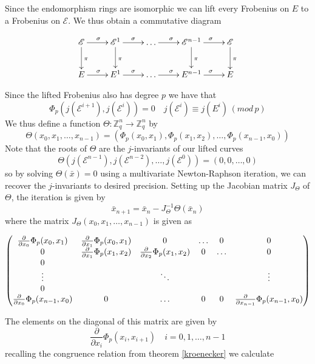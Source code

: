 Since the endomorphism rings are isomorphic we can lift every Frobenius on $E$ to a
Frobenius on $\mathscr{E}$. We thus obtain a commutative diagram

$$
\xymatrix {
  \mathscr{E} \ar[d]^\pi \ar[r]^\sigma & \mathscr{E}^1 \ar[d]^\pi \ar[r]^\sigma & \ldots \ar[r]^\sigma & \mathscr{E}^{n-1} \ar[d]^\pi \ar[r]^\sigma & \mathscr{E} \ar[d]^\pi \\
  E \ar[r]^\sigma & E^1 \ar[r]^\sigma &\ldots \ar[r]^\sigma & E^{n-1} \ar[r]^\sigma & E \\
}
$$

Since the lifted Frobenius also has degree $p$ we have that
$$\Phi_p(j(\mathscr{E}^{i+1}), j(\mathscr{E}^{i})) = 0 \quad j(\mathscr{E}^i) \equiv j(E^i) \, (mod\, p) $$
We thus define a function $\Theta: \mathbb{Z}_q^n \rightarrow \mathbb{Z}_q^n$ by
$$\Theta(x_0, x_1, \ldots, x_{n-1}) = (\Phi_p(x_0, x_1), \Phi_p(x_1, x_2), \ldots, \Phi_p(x_{n-1}, x_0))$$
Note that the roots of $\Theta$ are the $j$-invariants of our lifted curves
$$\Theta(j(\mathscr{E}^{n-1}), j(\mathscr{E}^{n-2}), \ldots, j(\mathscr{E}^0)) = (0, 0, \ldots, 0) $$
so by solving $\Theta(\bar{x}) = 0$ using a multivariate Newton-Raphson iteration, we can
recover the $j$-invariants to desired precision. Setting up the Jacobian matrix $J_\Theta$
of $\Theta$, the iteration is given by
$$ \bar{x}_{n+1} = \bar{x}_n - J_\Theta^{-1} \Theta(\bar{x}_n) $$
where the matrix $J_\Theta(x_0, x_1, \ldots, x_{n-1})$ is given as 

$$
\begin{pmatrix}
  {\partial \over \partial x_0} \Phi_p(x_0, x_1) & {\partial \over \partial x_1} \Phi_p(x_0, x_1) & 0 & \ldots & 0 & 0 \\
  0 & {\partial \over \partial x_1} \Phi_p(x_1, x_2) & {\partial \over \partial x_2} \Phi_p(x_1, x_2) & 0 & \ldots & 0 \\
  0 \\
  \vdots & & \ddots & & & \vdots \\
  0 \\
  {\partial \over \partial x_0} \Phi_p(x_{n-1}, x_0) & 0 & \ldots & 0 & 0 & {\partial \over \partial x_{n-1}} \Phi_p(x_{n-1}, x_0) \\
\end{pmatrix}
$$

The elements on the diagonal of this matrix are given by
$$ \frac{\partial}{\partial x_i} \Phi_p(x_i, x_{i+1}) \quad i =  0, 1, \ldots, n-1$$
recalling the congruence relation from theorem \ref{kroenecker} we calculate

